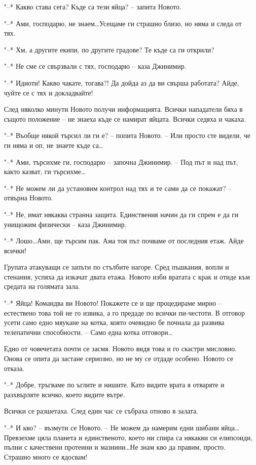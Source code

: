 \documentclass[ebook,openany,12pt]{memoir}
\begin{document}
"--* Какво става сега? Къде са тези яйца? – запита Новото.

"--* Ами, господарю, не знаем\ldots Усещаме ги страшно близо, но няма и следа от тях.

"--* Хм, а другите екипи, по другите градове? Те къде са ги открили?

"--* Не сме се свързвали с тях, господарю – каза Джинимир.

"--* Идиоти! Какво чакате, тогава?! Да дойда аз да ви свърша работата? Айде, чуйте се с тях и докладвайте!

След няколко минути Новото получи информацията. Всички нападатели бяха в същото положение – не знаеха къде се намират яйцата. Всички седяха и чакаха.

"--* Въобще някой търсил ли ги е? – попита Новото. – Или просто сте видели, че ги няма и оп, не знаете къде са\ldots

"--* Ами, търсихме ги, господарю – започна Джинимир. -- Под път и над път, както казват, ги търсихме\ldots

"--* Не можем ли да установим контрол над тях и те сами да се покажат? – отвърна Новото.

"--* Не, имат някаква странна защита. Единствения начин да ги спрем е да ги унищожим физически – каза Джинимир.

"--* Лошо\ldots Ами, ще търсим пак. Ама тоя път почваме от последния етаж. Айде всички!

Групата атакуващи се запъти по стълбите нагоре. Сред пъшкания, вопли и стенания, успяха да изкачат двата етажа. Новото изби вратата с крак и отиде към средата на голямата зала.

"--* Яйца! Командва ви Новото! Покажете се и ще процедираме мирно – естествено това той не го извика, а го предаде по всички пи-честоти. В отговор усети само едно мяукане на котка, която очевидно бе почнала да развива телепатични способности. – Само една котка отговори\ldots

Едно от човечетата почти се засмя. Новото видя това и го скастри мисловно. Онова се опита да застане сериозно, но не му се отдаде особено. Новото се отказа.

"--* Добре, тръгваме по ъглите и нишите. Като видите врата я отваряте и разхвърляте всичко, което видите вътре.

Всички се разшетаха. След един час се събраха отново в залата.

"--* И кво? – възмути се Новото. – Не можем да намерим едни шибани яйца\ldots Превзехме цяла планета и единственото, което ни спира са някакви си елипсоиди, пълни с качествени протеини и мазнини\ldots Не знам кво да правим, просто. Страшно много се ядосвам!
\end{document}
